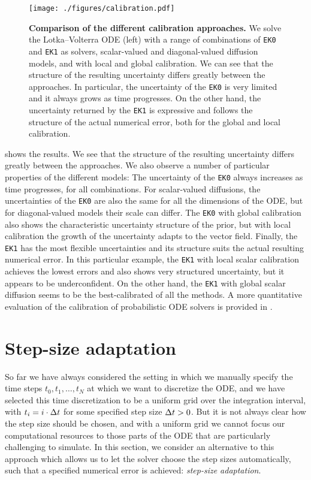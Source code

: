 \documentclass{mimosis}
\begin{document}
\begin{figure}[t]
\centering
\texttt{[image: ./figures/calibration.pdf]}
\caption{\label{fig:calibration}\textbf{Comparison of the different calibration approaches.} We solve the Lotka--Volterra ODE (left) with a range of combinations of \texttt{EK0} and \texttt{EK1} as solvers, scalar-valued and diagonal-valued diffusion models, and with local and global calibration. We can see that the structure of the resulting uncertainty differs greatly between the approaches. In particular, the uncertainty of the \texttt{EK0} is very limited and it always grows as time progresses. On the other hand, the uncertainty returned by the \texttt{EK1} is expressive and follows the structure of the actual numerical error, both for the global and local calibration.}
\end{figure}

 shows the results.
We see that the structure of the resulting uncertainty differs greatly between the approaches.
We also observe a number of particular properties of the different models:
The uncertainty of the \texttt{EK0} always increases as time progresses, for all combinations.
For scalar-valued diffusions, the uncertainties of the \texttt{EK0} are also the same for all the dimensions of the ODE, but for diagonal-valued models their scale can differ.
The \texttt{EK0} with global calibration also shows the characteristic uncertainty structure of the  prior, but with local calibration the growth of the uncertainty adapts to the vector field.
Finally, the \texttt{EK1} has the most flexible uncertainties and its structure suits the actual resulting numerical error.
In this particular example, the \texttt{EK1} with local scalar calibration achieves the lowest errors and also shows very structured uncertainty, but it appears to be underconfident.
On the other hand, the \texttt{EK1} with global scalar diffusion seems to be the best-calibrated of all the methods.
A more quantitative evaluation of the calibration of probabilistic ODE solvers is provided in \capos{}.
\section{Step-size adaptation}
\label{sec:orgad2d51c}
\label{sec:step-size-adaptation}

So far we have always considered the setting in which we manually specify the time steps \(t_0, t_1, \dots, t_N\) at which we want to discretize the ODE, and we have selected this time discretization to be a uniform grid over the integration interval, with \(t_i = i \cdot {\Delta t}\) for some specified step size \({\Delta t} > 0\).
But it is not always clear how the step size should be chosen, and with a uniform grid we cannot focus our computational resources to those parts of the ODE that are particularly challenging to simulate.
In this section, we consider an alternative to this approach which allows us to let the solver choose the step sizes automatically, such that a specified numerical error is achieved: \emph{step-size adaptation}.
\end{document}
